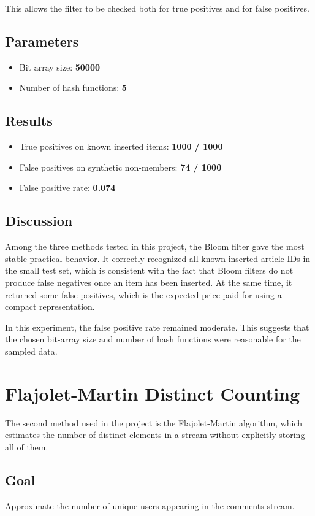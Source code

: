 \documentclass[11pt,a4paper]{article}
\begin{document}
This allows the filter to be checked both for true positives and for false positives.

\subsection*{Parameters}
\begin{itemize}
    \item Bit array size: \textbf{50000}
    \item Number of hash functions: \textbf{5}
\end{itemize}

\subsection*{Results}
\begin{itemize}
    \item True positives on known inserted items: \textbf{1000 / 1000}
    \item False positives on synthetic non-members: \textbf{74 / 1000}
    \item False positive rate: \textbf{0.074}
\end{itemize}

\subsection*{Discussion}
Among the three methods tested in this project, the Bloom filter gave the most stable practical behavior. It correctly recognized all known inserted article IDs in the small test set, which is consistent with the fact that Bloom filters do not produce false negatives once an item has been inserted. At the same time, it returned some false positives, which is the expected price paid for using a compact representation.

In this experiment, the false positive rate remained moderate. This suggests that the chosen bit-array size and number of hash functions were reasonable for the sampled data.

\section{Flajolet-Martin Distinct Counting}

The second method used in the project is the Flajolet-Martin algorithm, which estimates the number of distinct elements in a stream without explicitly storing all of them.

\subsection*{Goal}
Approximate the number of unique users appearing in the comments stream.
\end{document}
